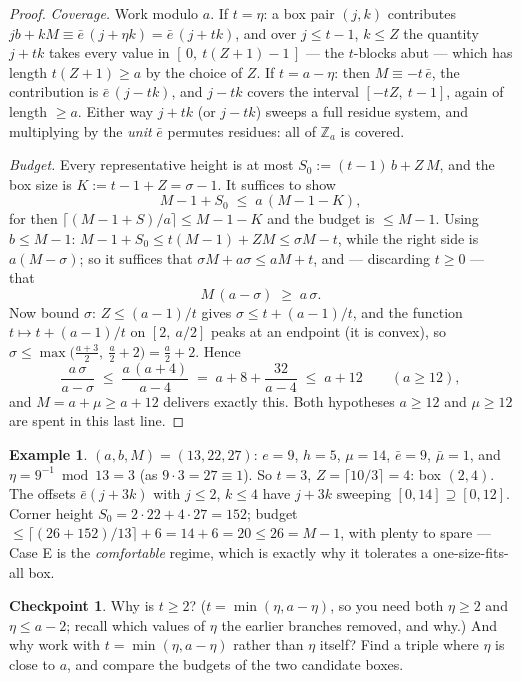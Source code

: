 \documentclass[11pt,reqno]{amsart}
\theoremstyle{plain}
\theoremstyle{definition}
\newtheorem{example}[theorem]{Example}
\newtheorem{checkpoint}[theorem]{Checkpoint}   %
\theoremstyle{remark}
\newcommand{\ZZ}{\mathbb{Z}}
\begin{document}
\begin{proof}
\emph{Coverage.} Work modulo $a$. If $t = \eta$: a box pair $(j, k)$ contributes
$jb + kM \equiv \bar e\,(j + \eta k) = \bar e\,(j + tk)$, and over $j \le t-1$,
$k \le Z$ the quantity $j + tk$ takes every value in $[\,0,\ t(Z+1) - 1\,]$ ---
the $t$-blocks abut --- which has length $t(Z+1) \ge a$ by the choice of $Z$. If
$t = a - \eta$: then $M \equiv -t\,\bar e$, the contribution is $\bar e\,(j -
tk)$, and $j - tk$ covers the interval $[-tZ,\ t-1]$, again of length $\ge a$.
Either way $j + tk$ (or $j - tk$) sweeps a full residue system, and multiplying
by the \emph{unit} $\bar e$ permutes residues: all of $\ZZ_a$ is covered.

\emph{Budget.} Every representative height is at most $S_0 := (t-1)\,b + Z\,M$,
and the box size is $K := t - 1 + Z = \sigma - 1$. It suffices to show
\[
  M - 1 + S_0 \;\le\; a\,(M - 1 - K) ,
\]
for then $\lceil (M-1+S)/a \rceil \le M - 1 - K$ and the budget is $\le M-1$.
Using $b \le M - 1$: $M - 1 + S_0 \le t(M-1) + ZM \le \sigma M - t$, while the
right side is $a(M - \sigma)$; so it suffices that $\sigma M + a\sigma \le aM +
t$, and --- discarding $t \ge 0$ --- that
\[
  M\,(a - \sigma) \;\ge\; a\,\sigma .
\]
Now bound $\sigma$: $Z \le (a-1)/t$ gives $\sigma \le t + (a-1)/t$, and the
function $t \mapsto t + (a-1)/t$ on $[2,\ a/2]$ peaks at an endpoint (it is
convex), so $\sigma \le \max\big( \tfrac{a+3}{2},\ \tfrac a2 + 2 \big) = \tfrac
a2 + 2$. Hence
\[
  \frac{a\,\sigma}{a - \sigma} \;\le\; \frac{a\,(a+4)}{a - 4}
  \;=\; a + 8 + \frac{32}{a-4} \;\le\; a + 12 \qquad (a \ge 12) ,
\]
and $M = a + \mu \ge a + 12$ delivers exactly this. Both hypotheses $a \ge 12$
and $\mu \ge 12$ are spent in this last line.
\end{proof}

\begin{example}\label{ex:caseE-friendly}
$(a, b, M) = (13, 22, 27)$: $e = 9$, $h = 5$, $\mu = 14$, $\bar e = 9$, $\bar\mu
= 1$, and $\eta = 9^{-1} \bmod 13 = 3$ (as $9 \cdot 3 = 27 \equiv 1$). So $t =
3$, $Z = \lceil 10/3 \rceil = 4$: box $(2, 4)$. The offsets $\bar e(j + 3k)$ with
$j \le 2$, $k \le 4$ have $j + 3k$ sweeping $[0, 14] \supseteq [0, 12]$. Corner
height $S_0 = 2 \cdot 22 + 4 \cdot 27 = 152$; budget $\le \lceil (26 + 152)/13
\rceil + 6 = 14 + 6 = 20 \le 26 = M - 1$, with plenty to spare --- Case E is the
\emph{comfortable} regime, which is exactly why it tolerates a one-size-fits-all
box.
\end{example}

\begin{checkpoint}
Why is $t \ge 2$? ($t = \min(\eta, a - \eta)$, so you need both $\eta \ge 2$ and
$\eta \le a - 2$; recall which values of $\eta$ the earlier branches removed, and
why.) And why work with $t = \min(\eta, a-\eta)$ rather than $\eta$ itself? Find
a triple where $\eta$ is close to $a$, and compare the budgets of the two
candidate boxes.
\end{checkpoint}
\end{document}
